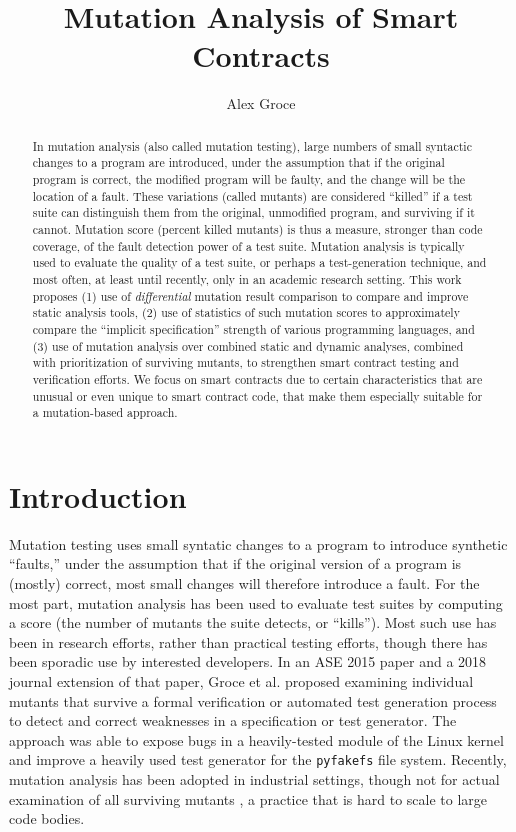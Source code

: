 \documentclass{article}
\title{Mutation Analysis of Smart Contracts}
\author{Alex Groce}
\begin{document}
\maketitle

\begin{abstract}
In mutation analysis (also called mutation testing), large numbers of small syntactic changes to a program are introduced, under the assumption that if the original program is correct, the modified program will be faulty, and the change will be the location of a fault.  These variations (called mutants) are considered ``killed'' if a test suite can distinguish them from the original, unmodified program, and surviving if it cannot.  Mutation score (percent killed mutants) is thus a measure, stronger than code coverage, of the fault detection power of a test suite.
Mutation analysis is typically used to evaluate the quality of a test suite, or perhaps a test-generation technique, and most often, at least until recently, only in an academic research setting.  This work proposes (1) use of \emph{differential} mutation result comparison to compare and improve static analysis tools, (2) use of statistics of such mutation scores to approximately compare the ``implicit specification'' strength of various programming languages, and (3) use of mutation analysis over combined static and dynamic analyses, combined with prioritization of surviving mutants, to strengthen smart contract testing and verification efforts.  We focus on smart contracts due to certain characteristics that are unusual or even unique to smart contract code, that make them especially suitable for a mutation-based approach.
\end{abstract}

\section{Introduction}

Mutation testing \cite{demillo1978hints,budd1980theoretical} uses small syntatic changes to a program to introduce synthetic ``faults,'' under the assumption that if the original version of a program is (mostly) correct, most small changes will therefore introduce a fault.  For the most part, mutation analysis has been used to evaluate test suites by computing a score (the number of mutants the suite detects, or ``kills'').  Most such use has been in research efforts, rather than practical testing efforts, though there has been sporadic use by interested developers.
In an ASE 2015 \cite{groce2015verified} paper and a 2018 journal extension \cite{groce2018verified} of that paper, Groce et al. proposed examining individual mutants that survive a formal verification or automated test generation process to detect and correct weaknesses in a specification or test generator.  The approach was able to expose bugs in a heavily-tested module of the Linux kernel \cite{mutKernel} and improve a heavily used test generator for the {\tt pyfakefs} file system.  Recently, mutation analysis has been adopted in industrial settings, though not for actual examination of all surviving mutants \cite{MutGoogle,ivankovic2018industrial}, a practice that is hard to scale to large code bodies.
\end{document}

